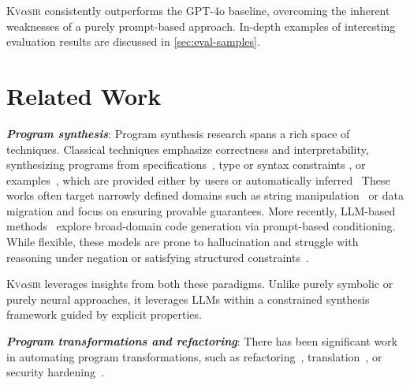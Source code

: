 \documentclass[nonacm,sigplan,review]{acmart}
\def\gptmodel{{GPT-4o}\xspace}
\newcommand{\sys}{{\scshape Kv{$\alpha$}sir}\xspace}
\newcommand{\heading}[1]{\vspace{2pt}\noindent\textbf{\emph{#1}}:\enspace}
\begin{document}
\sys consistently outperforms the \gptmodel baseline, overcoming the inherent weaknesses of a purely prompt-based approach.
In-depth examples of interesting evaluation results are discussed in \cref{sec:eval-samples}.



\section{Related Work}

\heading{Program synthesis}
Program synthesis research spans a rich space of techniques.
Classical techniques emphasize correctness and
interpretability, synthesizing programs from specifications~\cite{alur2013syntax, feser2015synthesizing, gulwani2011automating,leino2016dafny},
type or syntax constraints \cite{polikarpova2016program,reynolds2019syguscomp},
or examples~\cite{jha2010oracle, raza2018disjunctive, singh2016blinkfill,wu2023programming},
which are provided either by users or automatically inferred~\cite{cambronero2019active,harp:ccs:2021}
These works often target narrowly
defined domains such as string manipulation~\cite{harp:ccs:2021} or data migration
\cite{yaghmazadeh2018automated} and focus on ensuring provable guarantees.
More recently, LLM-based methods~\cite{austin2021program, chen2021evaluating}
explore broad-domain code generation via prompt-based conditioning.
While flexible, these models are prone to hallucination and struggle
with reasoning under negation or satisfying structured constraints~\cite{xu2023llmfoolitselfpromptbased, wu2023deceptpromptexploitingllmdrivencode,jiang2024llmsdreamelephantswhen,hwang2024thinkpinkelephant}.

\sys leverages insights from both these paradigms.
Unlike purely symbolic or purely neural approaches, it leverages LLMs within a
constrained synthesis framework guided by explicit properties.

\heading{Program transformations and refactoring}
There has been significant work in automating program transformations,
such as refactoring~\cite{Fowler99,Mens04,Myers16,burson1990program}, translation~\cite{kopetzki2021towards,ledley1962automatic}, or security hardening~\cite{vasilakis2018breakapp,mir:ccs:2021, rebau2001dependable}. %
\end{document}

